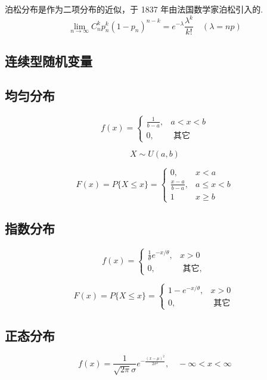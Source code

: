 \begin{theorem}[泊松定理]
    \label{thm:Poission}
泊松分布是作为二项分布的近似，于 1837 年由法国数学家泊松引入的.
$$
\lim _{n \rightarrow \infty} C_{n}^{k} p_{n}^{k}\left(1-p_{n}\right)^{n-k}=e^{-\lambda} \frac{\lambda^{k}}{k !}\quad (\lambda = np)
$$
\end{theorem}

\subsection{连续型随机变量}

\subsection{均匀分布}

$$
f(x)=\left\{\begin{array}{cc}
\frac{1}{b-a}, & a<x<b \\
0, & \text { 其它 }
\end{array}\right.
$$

$$ X \sim U(a,b) $$

$$
F(x)=P\{X \leq x\}=\left\{\begin{array}{ll}
0, & x<a \\
\frac{x-a}{b-a}, & a \leq x<b \\
1 & x \geq b
\end{array}\right.
$$

\subsection{指数分布}

$$
f(x)=\left\{\begin{array}{ll}
\frac{1}{\theta} e^{-x / \theta}, & x>0 \\
0, & \text { 其它, }
\end{array}\right.
$$

$$
F(x)=P\{X \leq x\}=\left\{\begin{array}{ll}
1-e^{-x / \theta}, & x>0 \\
0, & \text { 其它 }
\end{array}\right.
$$

\subsection{正态分布}

$$
f(x)=\frac{1}{\sqrt{2 \pi} \sigma} e^{-\frac{(x-\mu)^{2}}{2 \sigma^{2}}}, \quad-\infty<x<\infty
$$


